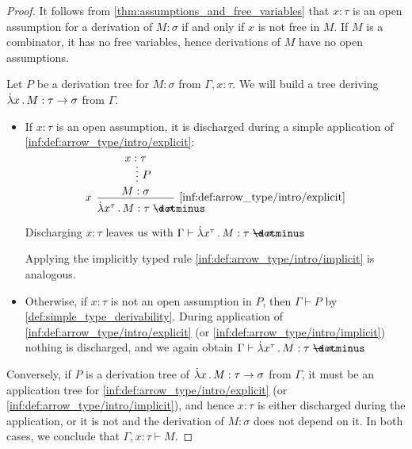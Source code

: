\begin{proof}
   It follows from \cref{thm:assumptions_and_free_variables} that \( x: \tau \) is an open assumption for a derivation of \( M: \sigma \) if and only if \( x \) is not free in \( M \). If \( M \) is a combinator, it has no free variables, hence derivations of \( M \) have no open assumptions.


  \SufficiencySubProof* Let \( P \) be a derivation tree for \( M: \sigma \) from \( \Gamma, x: \tau \). We will build a tree deriving \( \qabs x M: \tau \to \sigma \) from \( \Gamma \).

  \begin{itemize}
    \item If \( x: \tau \) is an open assumption, it is discharged during a simple application of \ref{inf:def:arrow_type/intro/explicit}:
    \begin{equation*}
      \begin{prooftree}
        \hypo{ x: \tau }
        \ellipsis { \( P \) } { M: \sigma }
        \infer[left label=\( x \)]1[\ref{inf:def:arrow_type/intro/explicit}]{ \qabs {x^\tau} M: \tau \synimplies \sigma }
      \end{prooftree}
    \end{equation*}

    Discharging \( x: \tau \) leaves us with \( \Gamma \vdash \qabs {x^\tau} M: \tau \synimplies \sigma \).

    Applying the implicitly typed rule \ref{inf:def:arrow_type/intro/implicit} is analogous.

    \item Otherwise, if \( x: \tau \) is not an open assumption in \( P \), then \( \Gamma \vdash P \) by \cref{def:simple_type_derivability}. During application of \ref{inf:def:arrow_type/intro/explicit} (or \ref{inf:def:arrow_type/intro/implicit}) nothing is discharged, and we again obtain \( \Gamma \vdash \qabs {x^\tau} M: \tau \synimplies \sigma \).
  \end{itemize}

  \NecessitySubProof* Conversely, if \( P \) is a derivation tree of \( \qabs x M: \tau \to \sigma \) from \( \Gamma \), it must be an application tree for \ref{inf:def:arrow_type/intro/explicit} (or \ref{inf:def:arrow_type/intro/implicit}), and hence \( x: \tau \) is either discharged during the application, or it is not and the derivation of \( M: \sigma \) does not depend on it. In both cases, we conclude that \( \Gamma, x: \tau \vdash M \).
\end{proof}

